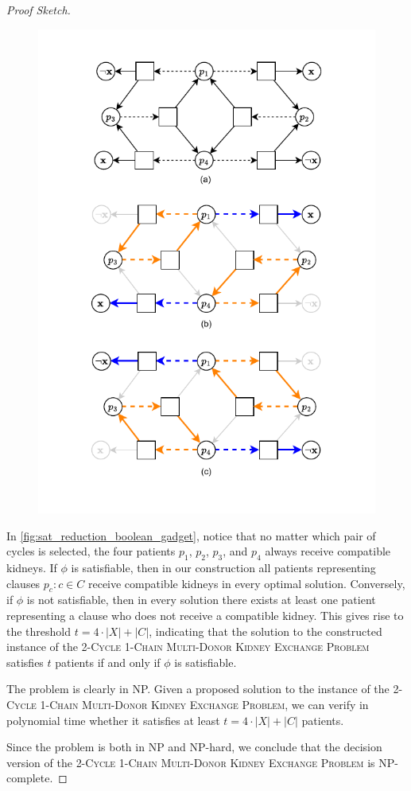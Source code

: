 \begin{proof}[Proof Sketch]
\begin{figure}
    \centering
    \includegraphics{data/sat_reduction_boolean_gadget.pdf}
    \caption[]{}
    \label{fig:sat_reduction_boolean_gadget}
\end{figure}

In \autoref{fig:sat_reduction_boolean_gadget}, notice that no matter which pair of cycles is selected, the four patients $p_1$, $p_2$, $p_3$, and $p_4$ always receive compatible kidneys. If $\phi$ is satisfiable, then in our construction all patients representing clauses ${ p_c : c \in C }$ receive compatible kidneys in every optimal solution. Conversely, if $\phi$ is not satisfiable, then in every solution there exists at least one patient representing a clause who does not receive a compatible kidney. This gives rise to the threshold $t = 4 \cdot |X| + |C|$, indicating that the solution to the constructed instance of the \textsc{2-Cycle 1-Chain Multi-Donor Kidney Exchange Problem} satisfies $t$ patients if and only if $\phi$ is satisfiable.

The problem is clearly in NP. Given a proposed solution to the instance of the \textsc{2-Cycle 1-Chain Multi-Donor Kidney Exchange Problem}, we can verify in polynomial time whether it satisfies at least $t = 4 \cdot |X| + |C|$ patients. 

Since the problem is both in NP and NP-hard, we conclude that the decision version of the \textsc{2-Cycle 1-Chain Multi-Donor Kidney Exchange Problem} is NP-complete.
\end{proof}


